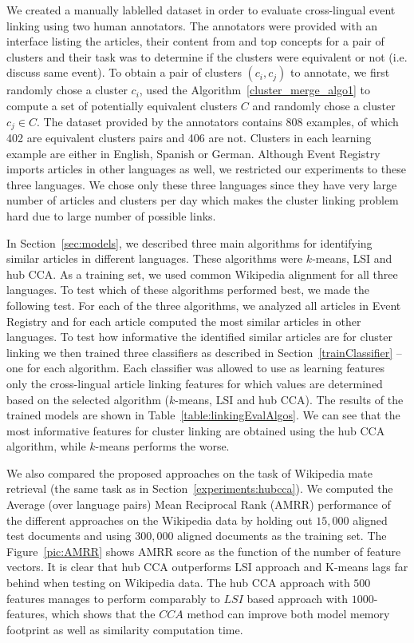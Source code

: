 \documentclass[twoside,11pt]{article}
\begin{document}
We created a manually lablelled dataset in order to evaluate cross-lingual event linking using two human annotators. The annotators were provided with an interface listing the articles, their content from and top concepts for a pair of clusters and their task was to determine if the clusters were equivalent or not (i.e. discuss same event). To obtain a pair of clusters $(c_i, c_j)$ to annotate, we first randomly chose a cluster $c_i$, used the Algorithm~\ref{cluster_merge_algo1} to compute a set of potentially equivalent clusters $C$ and randomly chose a cluster $c_j \in C$. The dataset provided by the annotators contains 808 examples, of which 402 are equivalent clusters pairs and 406 are not. Clusters in each learning example are either in English, Spanish or German. Although Event Registry imports articles in other languages as well, we restricted our experiments to these three languages. We chose only these three languages since they have very large number of articles and clusters per day which makes the cluster linking problem hard due to large number of possible links.

In Section~\ref{sec:models}, we  described three main algorithms for identifying similar articles in different languages. These algorithms were $k$-means, LSI and hub CCA. As a training set, we used common Wikipedia alignment for all three languages. To test which of these algorithms performed best, we made the following test. For each of the three algorithms, we analyzed all articles in Event Registry and for each article computed the most similar articles in other languages. To test how informative the identified similar articles are for cluster linking we then trained three classifiers as described in Section~\ref{trainClassifier} -- one for each algorithm. Each classifier was allowed to use as learning features only the cross-lingual article linking features for which values are determined based on the selected algorithm ($k$-means, LSI and hub CCA). The results of the trained models are shown in Table~\ref{table:linkingEvalAlgos}.
We can see that the most informative features for cluster linking are obtained using the hub CCA algorithm, while $k$-means performs the worse.

We also compared the proposed approaches on the task of Wikipedia mate retrieval (the same task as in Section~\ref{experiments:hubcca}). We computed the Average (over language pairs) Mean Reciprocal Rank (AMRR)   performance of the different approaches on the  Wikipedia data by holding out $15,000$ aligned test documents and using $300,000$ aligned documents as the training set. The Figure~\ref{pic:AMRR} shows AMRR score as the function of the number of feature vectors. It is clear that hub CCA outperforms LSI approach and K-means lags far behind when testing on Wikipedia data. The hub CCA approach with $500$ features manages to perform comparably to $LSI$ based approach with $1000$-features, which shows that the $CCA$ method can improve both model memory footprint as well as similarity computation time.
\end{document}
